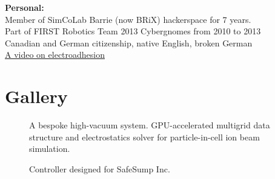 \documentclass[fleqn,11pt]{article}
\begin{document}
\light{\makebox[\linewidth]{\rule{\textwidth}{0.4pt}}}


%
\begin{tcolorbox}
	\textbf{Personal:\\}
	Member of SimCoLab Barrie (now BRiX) hackerspace for 7 years.\\
	Part of FIRST Robotics Team 2013 Cybergnomes from 2010 to 2013\\
	Canadian and German citizenship, native English, broken German\\
	\href{https://www.youtube.com/watch?v=TQFxafFIoNM}{A video on electroadhesion}
\end{tcolorbox}
%




\clearpage

\section{Gallery}
\begin{figure}[H]
	\centering
	\caption*{A bespoke high-vacuum system. GPU-accelerated multigrid data structure and electrostatics solver for particle-in-cell ion beam simulation.}
	\hfill
	
\end{figure}



\begin{figure}[H]
	\centering
	\caption*{Controller designed for SafeSump Inc.}
	\hfill
	
\end{figure}
\end{document}
